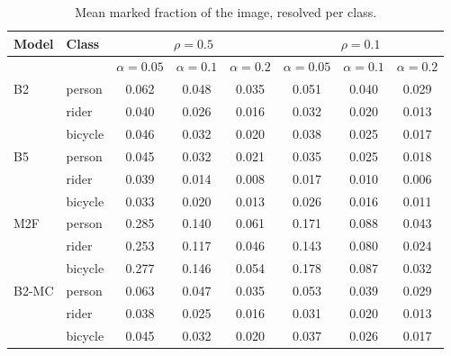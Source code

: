 \begin{table}[t]
\centering
\caption{Mean marked fraction of the image, resolved per class.}
\label{tab:perclass_area}
\scriptsize
\setlength{\tabcolsep}{2pt}
\begin{tabular}{llcccccc}
\toprule
Model & Class & \multicolumn{3}{c}{$\rho=0.5$} & \multicolumn{3}{c}{$\rho=0.1$} \\
\midrule
 & & $\alpha=0.05$ & $\alpha=0.1$ & $\alpha=0.2$ & $\alpha=0.05$ & $\alpha=0.1$ & $\alpha=0.2$ \\
\midrule
B2 & person & 0.062 & 0.048 & 0.035 & 0.051 & 0.040 & 0.029 \\
 & rider & 0.040 & 0.026 & 0.016 & 0.032 & 0.020 & 0.013 \\
 & bicycle & 0.046 & 0.032 & 0.020 & 0.038 & 0.025 & 0.017 \\
\addlinespace
B5 & person & 0.045 & 0.032 & 0.021 & 0.035 & 0.025 & 0.018 \\
 & rider & 0.039 & 0.014 & 0.008 & 0.017 & 0.010 & 0.006 \\
 & bicycle & 0.033 & 0.020 & 0.013 & 0.026 & 0.016 & 0.011 \\
\addlinespace
M2F & person & 0.285 & 0.140 & 0.061 & 0.171 & 0.088 & 0.043 \\
 & rider & 0.253 & 0.117 & 0.046 & 0.143 & 0.080 & 0.024 \\
 & bicycle & 0.277 & 0.146 & 0.054 & 0.178 & 0.087 & 0.032 \\
\addlinespace
B2-MC & person & 0.063 & 0.047 & 0.035 & 0.053 & 0.039 & 0.029 \\
 & rider & 0.038 & 0.025 & 0.016 & 0.031 & 0.020 & 0.013 \\
 & bicycle & 0.045 & 0.032 & 0.020 & 0.037 & 0.026 & 0.017 \\
\bottomrule
\end{tabular}
\end{table}
